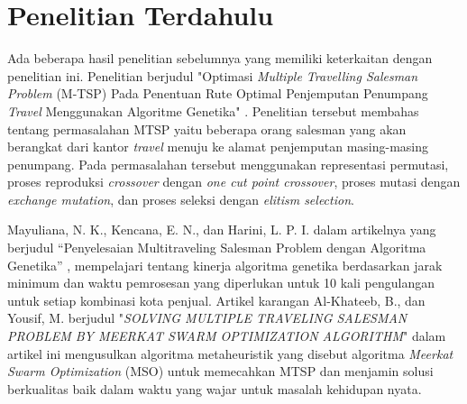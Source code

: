 
\section{Penelitian Terdahulu}

Ada beberapa hasil penelitian sebelumnya yang memiliki keterkaitan dengan penelitian ini. Penelitian berjudul "Optimasi \textit{Multiple Travelling Salesman Problem} (M-TSP) Pada Penentuan Rute Optimal Penjemputan Penumpang \textit{Travel} Menggunakan Algoritme Genetika" \cite{raditya2017optimasi}. Penelitian tersebut membahas tentang permasalahan MTSP yaitu beberapa orang salesman yang akan berangkat dari kantor \textit{travel} menuju ke alamat penjemputan masing-masing penumpang. Pada permasalahan tersebut menggunakan representasi permutasi, proses reproduksi \textit{crossover} dengan \textit{one cut point crossover}, proses mutasi dengan \textit{exchange mutation}, dan proses seleksi dengan \textit{elitism selection}.

Mayuliana, N. K., Kencana, E. N., dan Harini, L. P. I. dalam artikelnya yang berjudul “Penyelesaian Multitraveling Salesman Problem dengan Algoritma Genetika” \cite{mayuliana2015penyelesaian}, mempelajari tentang kinerja algoritma genetika berdasarkan jarak minimum dan waktu pemrosesan yang diperlukan untuk 10 kali pengulangan untuk setiap kombinasi kota penjual. Artikel karangan Al-Khateeb, B., dan Yousif, M. berjudul "\textit{SOLVING MULTIPLE TRAVELING SALESMAN PROBLEM BY MEERKAT SWARM OPTIMIZATION ALGORITHM}" \cite{al2019solving} dalam artikel ini mengusulkan algoritma metaheuristik yang disebut algoritma \textit{Meerkat Swarm Optimization} (MSO) untuk memecahkan MTSP dan menjamin solusi berkualitas baik dalam waktu yang wajar untuk masalah kehidupan nyata.
